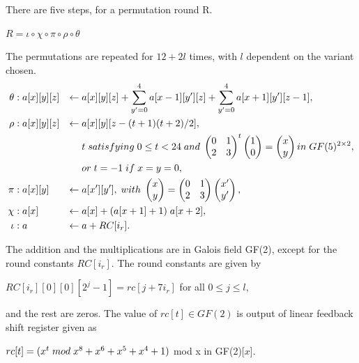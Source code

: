   There are five steps, for a permutation round R. 
  \begin{center}$R = \iota \circ \chi \circ \pi \circ \rho \circ \theta$\end{center}
  The permutations are repeated for $12 + 2l$ times, with $l$ dependent on the variant chosen. \\
  \begin{align*}
    \theta &: a[x][y][z] & \gets & \thickspace a[x][y][z] + \displaystyle\sum\limits_{y' = 0}^{4} a[x - 1][y'][z] + \displaystyle\sum\limits_{y' = 0}^{4} a[x + 1][y'][z - 1], \\
    \rho &: a[x][y][z] & \gets & \thickspace a[x][y][z - (t + 1)(t + 2) / 2], \\
    & & & \thickspace t \thickspace satisfying \thickspace 0 \leq t < 24 \thickspace and \thickspace
    \begin{pmatrix} 0 & 1 \\ 2 & 3 \end{pmatrix}^{t} \begin{pmatrix} 1 \\ 0 \end{pmatrix} = \begin{pmatrix} x \\ y \end{pmatrix}
    in \thickspace GF(5)^{2 \times 2}, \\
    & & & \thickspace or \thickspace t = -1 \thickspace if \thickspace x = y = 0, \\
    \pi &: a[x][y] & \gets & \thickspace a[x'][y'], \thickspace with \thickspace
    \begin{pmatrix} x \\ y \end{pmatrix} = \begin{pmatrix} 0 & 1 \\ 2 & 3 \end{pmatrix} \begin{pmatrix} x' \\ y'\end{pmatrix}, \\
    \chi &: a[x] & \gets & \thickspace a[x] + (a[x + 1] + 1) \thickspace a[x + 2], \\
    \iota &: a & \gets & \thickspace a + RC[i_{r}].
  \end{align*}

  The addition and the multiplications are in Galois field GF(2), except for the round constants $RC[i_{r}]$. The round constants 
  are given by
  \begin{center}$RC[i_{r}][0][0][2^{j} - 1] = rc[j + 7i_{r}]$ for all $ 0 \leq j \leq l$,\end{center}
  and the rest are zeros. The value of $rc[t] \in GF(2)$ is output of linear feedback shift register given as
  \begin{center}$rc[t] = (x^{t} \thickspace mod \thickspace x^{8} + x^{6} + x^{5} + x^{4} + 1)$ mod x in GF(2)[$x$].\end{center}

